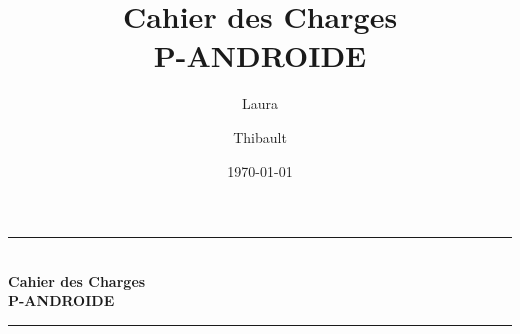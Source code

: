 \documentclass[12pt]{article}
\author{Laura \bsc{Greige} \and Thibault \bsc{Gigant}}
\date{\today}
\title{Cahier des Charges\\P-ANDROIDE}
\begin{document}
%
%

\begin{titlepage}

\newcommand{\HRule}{\rule{\linewidth}{0.7mm}} %

\center %
 
%



\hspace{3cm}
\vspace{2cm}


\HRule \\[0.4cm]
{ \huge \bfseries Cahier des Charges\\[0.4cm]P-ANDROIDE}\\[0.4cm] %
\HRule \\[2.5cm]
 

\end{titlepage}
\end{document}

